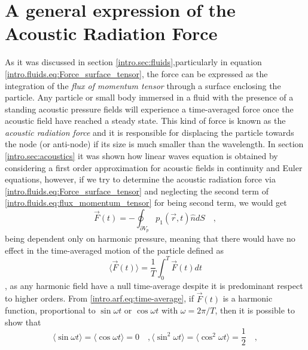 \section{A general expression of the Acoustic Radiation Force}\label{intro.sec:arf}
As it was discussed in section \ref{intro.sec:fluids},particularly in equation \ref{intro.fluids.eq:Force_surface_tensor}, the force can be expressed as the integration of the \textit{flux of momentum tensor} through a surface enclosing the particle. Any particle or small body immersed in a fluid with the presence of a standing acoustic pressure fields will experience a time-averaged force once the acoustic field have reached a steady state. This kind of force is known as the \textit{acoustic radiation force} and it is responsible for displacing the particle towards the node (or anti-node) if its size is much smaller than the wavelength. In section \ref{intro.sec:acoustics} it was shown how linear waves equation is obtained by considering a first order approximation for acoustic fields in continuity and Euler equations, however, if we try to determine the acoustic radiation force via \ref{intro.fluids.eq:Force_surface_tensor} and neglecting the second term of \ref{intro.fluids.eq:flux_momentum_tensor} for being second term, we would get
\begin{equation}\label{intro.arf.eq:Force_pressure}
    \vec F(t) = -\oint_{\partial V_p} p_1(\vec r,t) \hat n dS \quad, 
\end{equation}
being dependent only on harmonic pressure, meaning that there would have no effect in the time-averaged motion of the particle defined as
\begin{equation}\label{intro.arf.eq:time-average}
    \langle \vec F(t) \rangle = \frac{1}{T}\int_0^T \vec F(t) dt
\end{equation}
, as any harmonic field have a null time-average despite it is predominant respect to higher orders. From \eqref{intro.arf.eq:time-average}, if $\vec F(t)$ is a harmonic function, proportional to $\sin\omega t$ or $\cos\omega t$ with $\omega=2\pi/T$, then it is possible to show that
\begin{subequations}
\begin{equation}\label{intro.arf.eq:average_zero}
    \langle\sin\omega t\rangle = \langle\cos\omega t\rangle = 0\quad,
\end{equation}
\begin{equation}\label{intro.arf.eq:average_sq_half}
    \langle\sin^2\omega t\rangle = \langle\cos^2\omega t\rangle = \frac{1}{2}\quad,
\end{equation}
\end{subequations}
